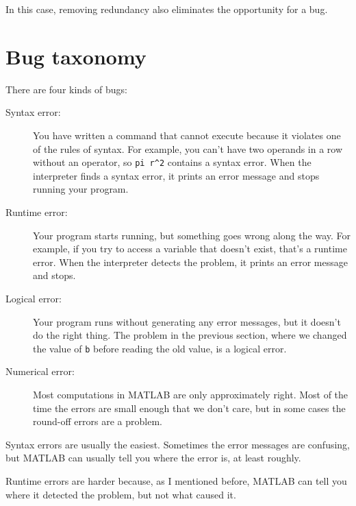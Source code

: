 \documentclass[main.tex]{subfiles}
\begin{document}
\begin{quote}
\end{quote}

In this case, removing redundancy also eliminates the opportunity for
a bug.


\section{Bug taxonomy}

There are four kinds of bugs:


\begin{description}

\item[Syntax error:] You have written a command that cannot
execute because it violates one of the rules of syntax.  For example,
you can't have two operands in a row without an operator, so
\verb+pi r^2+ contains a syntax error.  When the interpreter finds a syntax
error, it prints an error message and stops running your program.

\item[Runtime error:] Your program starts running, but something goes
wrong along the way.  For example, if you try to access a variable
that doesn't exist, that's a runtime error.  When the interpreter detects the
problem, it prints an error message and stops.

\item[Logical error:] Your program runs without generating any error
messages, but it doesn't do the right thing.  The problem in the
previous section, where we changed the value of {\tt b} before
reading the old value, is a logical error.

\item[Numerical error:] Most computations in MATLAB are only
approximately right.  Most of the time the errors are small enough
that we don't care, but in some cases the round-off errors are a problem.

\end{description}

Syntax errors are usually the easiest.  Sometimes the error messages
are confusing, but MATLAB can usually tell you where the error is, at
least roughly.

Runtime errors are harder because, as I mentioned before, MATLAB
can tell you where it detected the problem, but not what caused it.
\end{document}
